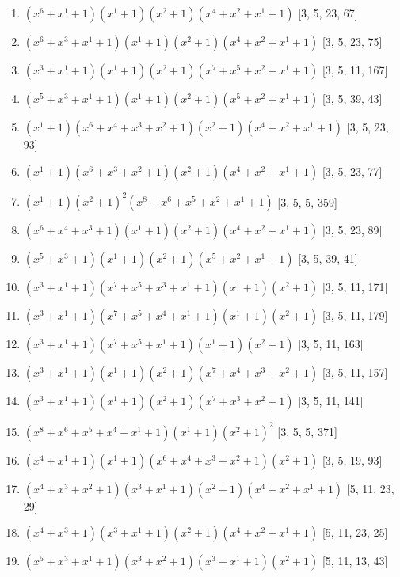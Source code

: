 \documentclass[10pt,twocolumn]{article}
\begin{document}
\begin{enumerate}
\item $(x^{6} + x^{1} + 1)(x^{1} + 1)(x^{2} + 1)(x^{4} + x^{2} + x^{1} + 1)$  [3, 5, 23, 67]
\item $(x^{6} + x^{3} + x^{1} + 1)(x^{1} + 1)(x^{2} + 1)(x^{4} + x^{2} + x^{1} + 1)$  [3, 5, 23, 75]
\item $(x^{3} + x^{1} + 1)(x^{1} + 1)(x^{2} + 1)(x^{7} + x^{5} + x^{2} + x^{1} + 1)$  [3, 5, 11, 167]
\item $(x^{5} + x^{3} + x^{1} + 1)(x^{1} + 1)(x^{2} + 1)(x^{5} + x^{2} + x^{1} + 1)$  [3, 5, 39, 43]
\item $(x^{1} + 1)(x^{6} + x^{4} + x^{3} + x^{2} + 1)(x^{2} + 1)(x^{4} + x^{2} + x^{1} + 1)$  [3, 5, 23, 93]
\item $(x^{1} + 1)(x^{6} + x^{3} + x^{2} + 1)(x^{2} + 1)(x^{4} + x^{2} + x^{1} + 1)$  [3, 5, 23, 77]
\item $(x^{1} + 1)(x^{2} + 1)^{2}(x^{8} + x^{6} + x^{5} + x^{2} + x^{1} + 1)$  [3, 5, 5, 359]
\item $(x^{6} + x^{4} + x^{3} + 1)(x^{1} + 1)(x^{2} + 1)(x^{4} + x^{2} + x^{1} + 1)$  [3, 5, 23, 89]
\item $(x^{5} + x^{3} + 1)(x^{1} + 1)(x^{2} + 1)(x^{5} + x^{2} + x^{1} + 1)$  [3, 5, 39, 41]
\item $(x^{3} + x^{1} + 1)(x^{7} + x^{5} + x^{3} + x^{1} + 1)(x^{1} + 1)(x^{2} + 1)$  [3, 5, 11, 171]
\item $(x^{3} + x^{1} + 1)(x^{7} + x^{5} + x^{4} + x^{1} + 1)(x^{1} + 1)(x^{2} + 1)$  [3, 5, 11, 179]
\item $(x^{3} + x^{1} + 1)(x^{7} + x^{5} + x^{1} + 1)(x^{1} + 1)(x^{2} + 1)$  [3, 5, 11, 163]
\item $(x^{3} + x^{1} + 1)(x^{1} + 1)(x^{2} + 1)(x^{7} + x^{4} + x^{3} + x^{2} + 1)$  [3, 5, 11, 157]
\item $(x^{3} + x^{1} + 1)(x^{1} + 1)(x^{2} + 1)(x^{7} + x^{3} + x^{2} + 1)$  [3, 5, 11, 141]
\item $(x^{8} + x^{6} + x^{5} + x^{4} + x^{1} + 1)(x^{1} + 1)(x^{2} + 1)^{2}$  [3, 5, 5, 371]
\item $(x^{4} + x^{1} + 1)(x^{1} + 1)(x^{6} + x^{4} + x^{3} + x^{2} + 1)(x^{2} + 1)$  [3, 5, 19, 93]
\item $(x^{4} + x^{3} + x^{2} + 1)(x^{3} + x^{1} + 1)(x^{2} + 1)(x^{4} + x^{2} + x^{1} + 1)$  [5, 11, 23, 29]
\item $(x^{4} + x^{3} + 1)(x^{3} + x^{1} + 1)(x^{2} + 1)(x^{4} + x^{2} + x^{1} + 1)$  [5, 11, 23, 25]
\item $(x^{5} + x^{3} + x^{1} + 1)(x^{3} + x^{2} + 1)(x^{3} + x^{1} + 1)(x^{2} + 1)$  [5, 11, 13, 43]

\end{enumerate}
\end{document}
